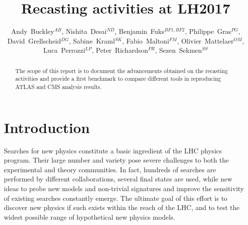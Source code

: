\documentclass[11pt]{cernrep}
\begin{document}
\setlength\parindent{0pt}

\title{Recasting activities at LH2017}

\author{
Andy~Buckley$^{AB}$, 
Nishita~Desai$^{ND}$,
Benjamin~Fuks$^{BF1,BF2}$,
Philippe~Gras$^{PG}$, 
David~Grellscheid$^{DG}$,
Sabine~Kraml$^{SK}$,
Fabio~Maltoni$^{FM}$,
Olivier~Mattelaer$^{OM}$,
Luca~Perrozzi$^{LP}$,
Peter~Richardson$^{PR}$,
Sezen~Sekmen$^{SS}$
}


\maketitle

\begin{abstract}
The scope of this report is to document the advancements obtained on the recasting
activities and provide a first benchmark to compare different tools in reproducing ATLAS and CMS analysis results.
\end{abstract}

\section{Introduction}

Searches for new physics constitute a basic ingredient of the LHC physics program.
Their large number and variety pose severe challenges to both the experimental and theory communities.
In fact, hundreds of searches are performed by different collaborations, several final states are used,
while new ideas 
to probe new models and non-trivial signatures and improve the sensitivity of existing searches constantly emerge.
The ultimate goal of this effort is to discover new physics if such
exists within the reach of the LHC, and to test the widest possible range of hypothetical new physics models.
\end{document}
